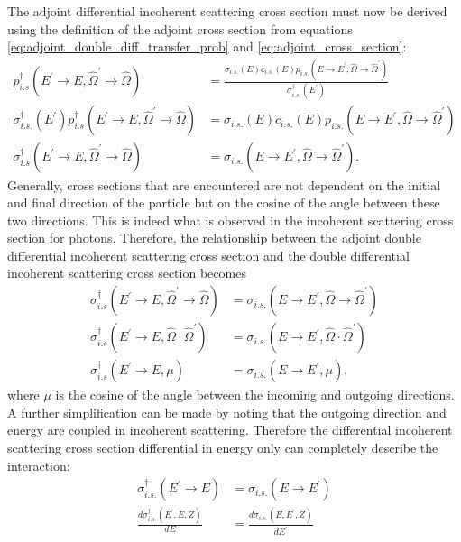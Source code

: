 The adjoint differential incoherent scattering cross section must now be 
derived using the definition of the adjoint cross section from equations
\ref{eq:adjoint_double_diff_transfer_prob} and \ref{eq:adjoint_cross_section}:
\begin{align}
  p_{i.s}^{\dagger}(E^{'} \to E, \hat{\Omega}^{'} \to \hat{\Omega}) & =
  \frac{\sigma_{i.s.}(E)c_{i.s.}(E)
    p_{i.s.}(E \to E^{'},\hat{\Omega} \to \hat{\Omega}^{'})}
  {\sigma_{i.s.}^{\dagger}(E^{'})} \nonumber \\
  \sigma_{i.s.}^{\dagger}(E^{'})
  p_{i.s}^{\dagger}(E^{'} \to E, \hat{\Omega}^{'} \to \hat{\Omega}) & = 
  \sigma_{i.s.}(E)c_{i.s.}(E)p_{i.s.}(E \to E^{'},\hat{\Omega} \to \hat{\Omega}^{'})
  \nonumber \\
  \sigma_{i.s}^{\dagger}(E^{'} \to E, \hat{\Omega}^{'} \to \hat{\Omega}) & = 
  \sigma_{i.s.}(E \to E^{'},\hat{\Omega} \to \hat{\Omega}^{'}).
\end{align}
Generally, cross sections that are encountered are not dependent on the 
initial and final direction of the particle but on the cosine of the angle
between these two directions. This is indeed what is observed in the incoherent 
scattering cross section for photons. Therefore, the relationship between the
adjoint double differential incoherent scattering cross section and the 
double differential incoherent scattering cross section becomes
\begin{align}
  \sigma_{i.s}^{\dagger}(E^{'} \to E, \hat{\Omega}^{'} \to \hat{\Omega}) & = 
  \sigma_{i.s.}(E \to E^{'},\hat{\Omega} \to \hat{\Omega}^{'}) \nonumber \\
  \sigma_{i.s}^{\dagger}(E^{'} \to E, \hat{\Omega} \cdot \hat{\Omega}^{'}) & = 
  \sigma_{i.s.}(E \to E^{'},\hat{\Omega} \cdot \hat{\Omega}^{'}) \nonumber \\
  \sigma_{i.s}^{\dagger}(E^{'} \to E, \mu) & = 
  \sigma_{i.s.}(E \to E^{'}, \mu),
\end{align}
where $\mu$ is the cosine of the angle between the incoming and outgoing 
directions. A further simplification can be made by noting that the outgoing
direction and energy are coupled in incoherent scattering. Therefore the 
differential incoherent scattering cross section differential in energy only
can completely describe the interaction:
\begin{align}
  \sigma_{i.s.}^{\dagger}(E^{'} \to E) & = \sigma_{i.s.}(E \to E^{'}) \nonumber \\
  \frac{d\sigma_{i.s.}^{\dagger}(E^{'},E,Z)}{dE} & = 
  \frac{d\sigma_{i.s.}(E,E^{'},Z)}{dE^{'}}
  \label{eq:adjoint_forward_cross_sec_rel}
\end{align}

